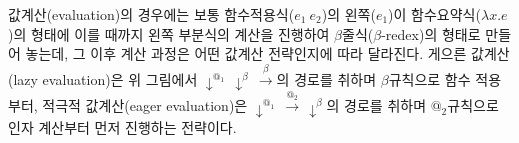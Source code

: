 \begin{quote}
\end{quote}

\noindent 값계산(evaluation)의 경우에는 보통 함수적용식(\(e_1~e_2\))의
왼쪽(\(e_1\))이 함수요약식(\(\lambda x.e\))의 형태에 이를 때까지 왼쪽
부분식의 계산을 진행하여 \(\beta\)줄식(\(\beta\)-redex)의 형태로 만들어
놓는데, 그 이후 계산 과정은 어떤 값계산 전략인지에 따라 달라진다. 게으른
값계산(lazy evaluation)은 위 그림에서
\(\downarrow^{\textrm{@}_1}\,\downarrow^{\beta}\,\xrightarrow{\beta}\)의
경로를 취하며 \(\beta\)규칙으로 함수 적용부터, 적극적 값계산(eager
evaluation)은
\(\downarrow^{\textrm{@}_1}\,\xrightarrow{\textrm{@}_2}\,\downarrow^{\beta}\)의
경로를 취하며 \(\textrm{@}_2\)규칙으로 인자 계산부터 먼저 진행하는
전략이다.

